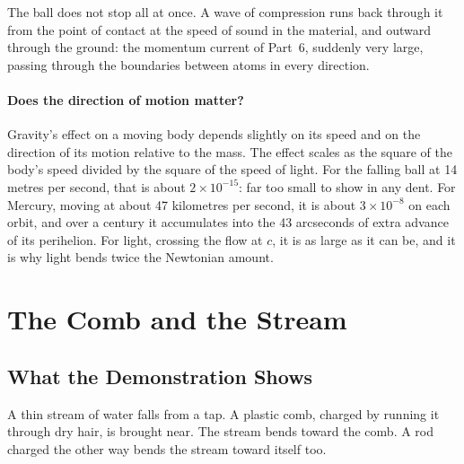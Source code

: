  The ball does not stop all at once. A wave of compression runs back through it from the point of contact at the speed of sound in the material, and outward through the ground: the momentum current of Part~6, suddenly very large, passing through the boundaries between atoms in every direction. 

\paragraph{Does the direction of motion matter?} Gravity's effect on a moving body depends slightly on its speed and on the direction of its motion relative to the mass. The effect scales as the square of the body's speed divided by the square of the speed of light. For the falling ball at 14 metres per second, that is about $2\times10^{-15}$: far too small to show in any dent. For Mercury, moving at about 47 kilometres per second, it is about $3\times10^{-8}$ on each orbit, and over a century it accumulates into the 43 arcseconds of extra advance of its perihelion. For light, crossing the flow at $c$, it is as large as it can be, and it is why light bends twice the Newtonian amount. 

\FloatBarrier
\section{The Comb and the Stream}
\label{sec:comb}

\subsection*{What the Demonstration Shows}

A thin stream of water falls from a tap. A plastic comb, charged by running it through dry hair, is brought near. The stream bends toward the comb. A rod charged the other way bends the stream toward itself too.

